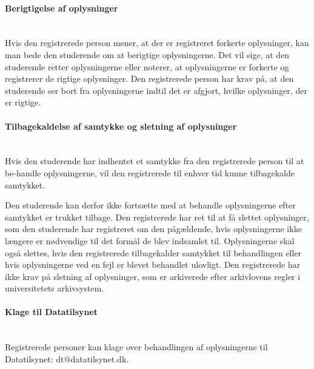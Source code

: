 \documentclass[11pt, a4paper]{article}
\begin{document}
\paragraph{Berigtigelse af oplysninger}~\\
Hvis den registrerede person mener, at der er registreret forkerte oplysninger, kan man bede den studerende om at berigtige oplysningerne. Det vil sige, at den studerende retter oplysningerne eller noterer, at oplysningerne er forkerte og registrerer de rigtige oplysninger. Den registrerede person har krav på, at den studerende ser bort fra oplysningerne indtil det er afgjort, hvilke oplysninger, der er rigtige.

\paragraph{Tilbagekaldelse af samtykke og sletning af oplysninger}~\\
Hvis den studerende har indhentet et samtykke fra den registrerede person til at be-handle oplysningerne, vil den registrerede til enhver tid kunne tilbagekalde samtykket. 

Den studerende kan derfor ikke fortsætte med at behandle oplysningerne efter samtykket er trukket tilbage.
Den registrerede har ret til at få slettet oplysninger, som den studerende har registreret om den pågældende, hvis oplysningerne ikke længere er nødvendige til det formål de blev indsamlet til. Oplysningerne skal også slettes, hvis den registrerede tilbagekalder samtykket til behandlingen eller hvis oplysningerne ved en fejl er blevet behandlet ulovligt. Den registrerede har ikke krav på sletning af oplysninger, som er arkiverede efter arkivlovens regler i universitetets arkivsystem.

\paragraph{Klage til Datatilsynet}~\\
Registrerede personer kan klage over behandlingen af oplysningerne til Datatilsynet: {\color{blue}dt@datatilsynet.dk}.
\end{document}
